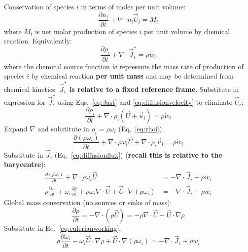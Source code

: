 \noindent
Conservation of species $i$ in terms of moles per unit volume:
\begin{equation}
\frac{\partial n_i}{\partial t} + \nabla \cdot n_i \vec{U}_i = \dot{M}_i
\end{equation}
where $\dot{M}_i$ is net molar production of species $i$ per unit volume by chemical reaction.  Equivalently:
\begin{equation}
\frac{\partial \rho_i}{\partial t} + \nabla \cdot \vec{J}^\ast_i = \rho \dot{w}_i
\end{equation}
where the chemical source function $\dot{w}$ represents the mass rate of production of species $i$ by chemical reaction \textbf{per unit mass} and may be determined from chemical kinetics.  \textbf{$\vec{J}^\ast_i$ is relative to a fixed reference frame}.  Substitute in expression for $\vec{J}^\ast_i$ using Eqs.~\ref{eq:Jast} and \ref{eq:diffusionvelocity} to eliminate $\vec{U}_i$:
\begin{equation}
\frac{\partial \rho_i}{\partial t} + \nabla \cdot \rho_i (\vec{U} + \vec{u}_i)= \rho \dot{w}_i
\end{equation}
Expand $\nabla$ and substitute in $\rho_i= \rho \omega_i$ (Eq.~\ref{eq:rhoi}):
\begin{equation}
\frac{\partial (\rho \omega_i)}{\partial t}  + \nabla \cdot \rho \omega_i \vec{U} + \nabla \cdot \rho_i \vec{u}_i = \rho \dot{w}_i
\end{equation}
Substitute in $\vec{J}_i$ (Eq.~\ref{eq:diffusionflux}) (\textbf{recall this is relative to the barycentre}):
\begin{align}
\frac{\partial (\rho \omega_i)}{\partial t} + \nabla \cdot \rho \omega_i \vec{U} &= - \nabla \cdot \vec{J}_i + \rho \dot{w}_i\\
\rho \frac{\partial \omega_i}{\partial t} + \omega_i \frac{\partial \rho}{\partial t} + \rho \omega_i \nabla \cdot \vec{U} + \vec{U} \cdot \nabla (\rho \omega_i) &= - \nabla \cdot \vec{J}_i + \rho \dot{w}_i \label{eq:eulerianworking}
\end{align}
Global mass conservation (no sources or sinks of mass):
\begin{equation}
\frac{\partial \rho}{\partial t} = - \nabla \cdot (\rho \vec{U} ) = -\rho \nabla \cdot \vec{U} - \vec{U} \cdot \nabla \rho
\end{equation}
Substitute in Eq.~\ref{eq:eulerianworking}:
\begin{equation}
\rho \frac{\partial \omega_i}{\partial t} - \omega_i \vec{U} \cdot \nabla \rho + \vec{U} \cdot \nabla (\rho \omega_i) = - \nabla \cdot \vec{J}_i + \rho \dot{w}_i
\end{equation}
